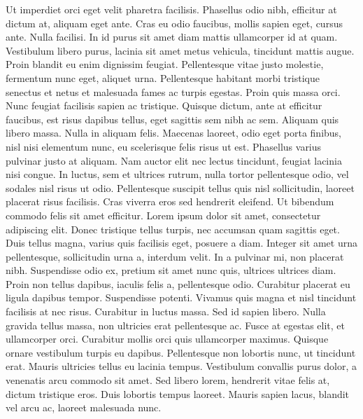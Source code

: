 \begin{assignment}
{        Ut imperdiet orci eget velit pharetra facilisis. Phasellus odio nibh, efficitur at dictum at, aliquam eget ante. Cras eu odio faucibus, mollis sapien eget, cursus ante. Nulla facilisi. In id purus sit amet diam mattis ullamcorper id at quam. Vestibulum libero purus, lacinia sit amet metus vehicula, tincidunt mattis augue. Proin blandit eu enim dignissim feugiat. Pellentesque vitae justo molestie, fermentum nunc eget, aliquet urna. Pellentesque habitant morbi tristique senectus et netus et malesuada fames ac turpis egestas. Proin quis massa orci. Nunc feugiat facilisis sapien ac tristique. Quisque dictum, ante at efficitur faucibus, est risus dapibus tellus, eget sagittis sem nibh ac sem. Aliquam quis libero massa. Nulla in aliquam felis. Maecenas laoreet, odio eget porta finibus, nisl nisi elementum nunc, eu scelerisque felis risus ut est. Phasellus varius pulvinar justo at aliquam. Nam auctor elit nec lectus tincidunt, feugiat lacinia nisi congue. In luctus, sem et ultrices rutrum, nulla tortor pellentesque odio, vel sodales nisl risus ut odio. Pellentesque suscipit tellus quis nisl sollicitudin, laoreet placerat risus facilisis. Cras viverra eros sed hendrerit eleifend. Ut bibendum commodo felis sit amet efficitur. Lorem ipsum dolor sit amet, consectetur adipiscing elit. Donec tristique tellus turpis, nec accumsan quam sagittis eget. Duis tellus magna, varius quis facilisis eget, posuere a diam. Integer sit amet urna pellentesque, sollicitudin urna a, interdum velit. In a pulvinar mi, non placerat nibh. Suspendisse odio ex, pretium sit amet nunc quis, ultrices ultrices diam. Proin non tellus dapibus, iaculis felis a, pellentesque odio. Curabitur placerat eu ligula dapibus tempor. Suspendisse potenti. Vivamus quis magna et nisl tincidunt facilisis at nec risus. 
    }
    Curabitur in luctus massa. Sed id sapien libero. Nulla gravida tellus massa, non ultricies erat pellentesque ac. Fusce at egestas elit, et ullamcorper orci. Curabitur mollis orci quis ullamcorper maximus. Quisque ornare vestibulum turpis eu dapibus. Pellentesque non lobortis nunc, ut tincidunt erat. Mauris ultricies tellus eu lacinia tempus. Vestibulum convallis purus dolor, a venenatis arcu commodo sit amet. Sed libero lorem, hendrerit vitae felis at, dictum tristique eros. Duis lobortis tempus laoreet. Mauris sapien lacus, blandit vel arcu ac, laoreet malesuada nunc.
\end{assignment}


